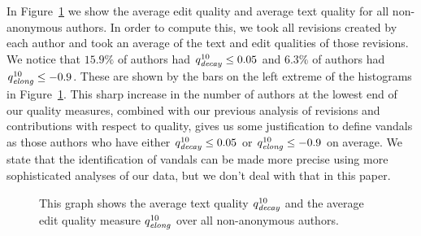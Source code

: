 In Figure~\ref{fig-user-quality} we show the average edit quality
and average text quality for all non-anonymous authors.
In order to compute this, we took all revisions created by each 
author and took an average of the text and edit qualities of 
those revisions.
We notice that $15.9\%$ of authors had $\quality{decay}{10}{} \le 0.05$
and $6.3\%$ of authors had $\quality{elong}{10}{} \le -0.9$.
These are shown by the bars on the left extreme of the
histograms in Figure~\ref{fig-user-quality}.
This sharp increase in the number of authors at the lowest end
of our quality measures, combined with our previous analysis
of revisions and contributions with respect to quality, gives
us some justification to define vandals as those
authors who have either $\quality{decay}{10}{} \le 0.05$ or 
$\quality{elong}{10}{} \le -0.9$ on average.
We state that the identification of vandals can be made more
precise using more sophisticated analyses of our data, but we
don't deal with that in this paper.
%
\begin{figure}[tbhp]
    \begin{center}
    \end{center}
    \caption[Measuring edit and text quality for all authors]{
    	This graph shows the average text quality $\quality{decay}{10}{}$
	and the average edit quality measure $\quality{elong}{10}{}$
	over all non-anonymous authors.
    }
    \label{fig-user-quality}
\end{figure}
%

